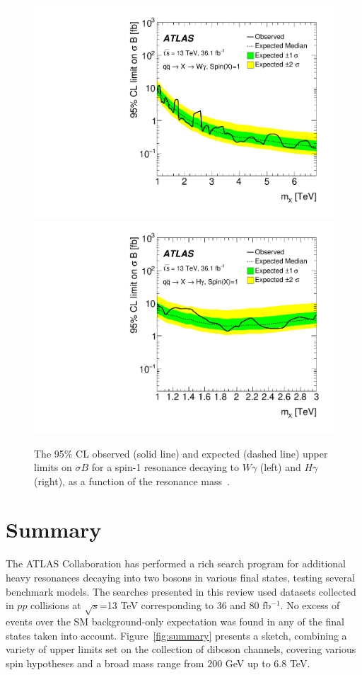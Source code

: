 \documentclass{PoS}
\begin{document}
 \begin{figure}
     \includegraphics[width=.5\textwidth]{figures/lim_Wg_qqA1}
     \includegraphics[width=.5\textwidth]{figures/lim_Hg_qqA1}
     \caption{The 95\% CL observed (solid line) and expected (dashed line) upper limits on $\sigma B$ for a spin-1 resonance decaying to $W\gamma$ (left) and $H\gamma$ (right), as a function of the resonance mass~\cite{EXOT-2016-30}.}
     \label{fig:Wg_lim}
     \end{figure}


\section{Summary}
\label{sec:sum}

The ATLAS Collaboration has performed a rich search program for additional heavy resonances decaying into two bosons in various final states, testing several benchmark models.
The searches presented in this review used datasets collected in $pp$ collisions at $\sqrt{s}$=13 TeV corresponding to 36 and 80 fb$^{-1}$.
No excess of events over the SM background-only expectation was found in any of the final states taken into account. 
Figure~\ref{fig:summary} presents a sketch, combining a variety of upper limits set on the collection of diboson channels, covering various spin hypotheses and a broad mass range from 200 GeV up to 6.8 TeV.
\end{document}
